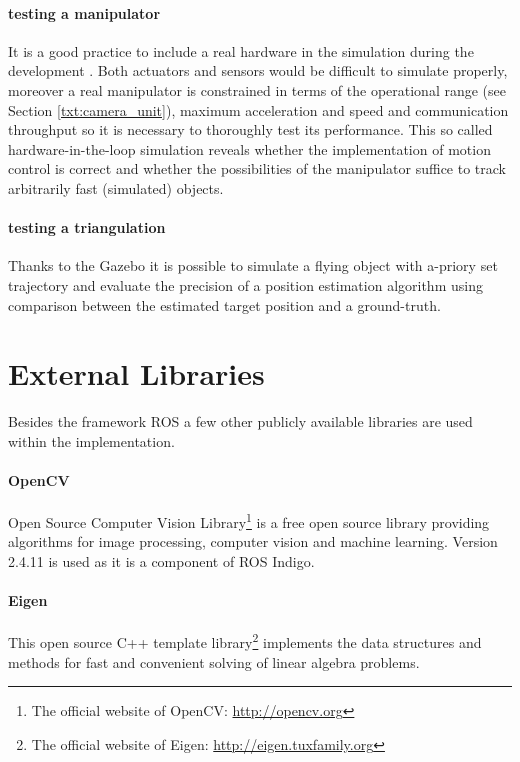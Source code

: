 \paragraph{testing a manipulator} It is a good practice to include a real hardware in the simulation during the development \cite{on_hw_in_the_loop}. Both actuators and sensors would be difficult to simulate properly, moreover a real manipulator is constrained in terms of the operational range (see Section \ref{txt:camera_unit}), maximum acceleration and speed and communication throughput so it is necessary to thoroughly test its performance. This so called hardware-in-the-loop simulation reveals whether the implementation of motion control is correct and whether the possibilities of the manipulator suffice to track arbitrarily fast (simulated) objects.

\paragraph{testing a triangulation} Thanks to the Gazebo it is possible to simulate a flying object with a-priory set trajectory and evaluate the precision of a position estimation algorithm using comparison between the estimated target position and a ground-truth.

\section{External Libraries} \label{txt:external_libraries}

Besides the framework ROS a few other publicly available libraries are used within the implementation.

\paragraph{OpenCV} Open Source Computer Vision Library\footnote{The official website of OpenCV: \url{http://opencv.org}} is a free open source library providing algorithms for image processing, computer vision and machine learning. Version 2.4.11 is used as it is a component of ROS Indigo.

\paragraph{Eigen} This open source C++ template library\footnote{The official website of Eigen: \url{http://eigen.tuxfamily.org}} implements the data structures and methods for fast and convenient solving of linear algebra problems.

